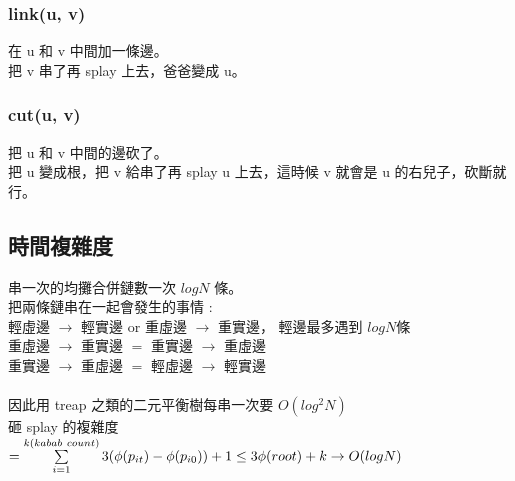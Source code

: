             \subsubsection{link(u, v)}
            在 u 和 v 中間加一條邊。\\
            把 v 串了再 splay 上去，爸爸變成 u。\\
            \subsubsection{cut(u, v)}
            把 u 和 v 中間的邊砍了。\\
            把 u 變成根，把 v 給串了再 splay u 上去，這時候 v 就會是 u 的右兒子，砍斷就行。\\
        \subsection{時間複雜度}
            串一次的均攤合併鏈數一次 $logN$ 條。\\
            把兩條鏈串在一起會發生的事情 : \\
            輕虛邊 $\to$ 輕實邊 or 重虛邊 $\to$ 重實邊，
            輕邊最多遇到 $logN$條\\
            重虛邊 $\to$ 重實邊 $=$ 重實邊 $\to$ 重虛邊\\
            重實邊 $\to$ 重虛邊 $=$ 輕虛邊 $\to$ 輕實邊\\\\
            因此用 treap 之類的二元平衡樹每串一次要 $O(log^2N)$ \\
            砸 splay 的複雜度 $ = \sum\limits_{i = 1}^{k(kabab \ count)}{3(\phi(p_{it}) - \phi(p_{i0})) + 1} \\ \le 3\phi(root) + k \to O(logN)$ \\
